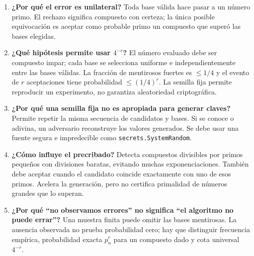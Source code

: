 \begin{enumerate}
\item \textbf{¿Por qué el error es unilateral?} Toda base válida hace pasar a un número primo. El rechazo significa compuesto con certeza; la única posible equivocación es aceptar como probable primo un compuesto que superó las bases elegidas.

\item \textbf{¿Qué hipótesis permite usar $4^{-r}$?} El número evaluado debe ser compuesto impar; cada base se selecciona uniforme e independientemente entre las bases válidas. La fracción de mentirosos fuertes es $\le1/4$ y el evento de $r$ aceptaciones tiene probabilidad $\le(1/4)^r$. La semilla fija permite reproducir un experimento, no garantiza aleatoriedad criptográfica.

\item \textbf{¿Por qué una semilla fija no es apropiada para generar claves?} Permite repetir la misma secuencia de candidatos y bases. Si se conoce o adivina, un adversario reconstruye los valores generados. Se debe usar una fuente segura e impredecible como \texttt{secrets.SystemRandom}.

\item \textbf{¿Cómo influye el precribado?} Detecta compuestos divisibles por primos pequeños con divisiones baratas, evitando muchas exponenciaciones. También debe aceptar cuando el candidato coincide exactamente con uno de esos primos. Acelera la generación, pero no certifica primalidad de números grandes que lo superan.

\item \textbf{¿Por qué ``no observamos errores'' no significa ``el algoritmo no puede errar''?} Una muestra finita puede omitir las bases mentirosas. La ausencia observada no prueba probabilidad cero; hay que distinguir frecuencia empírica, probabilidad exacta $p_n^r$ para un compuesto dado y cota universal $4^{-r}$.
\end{enumerate}
